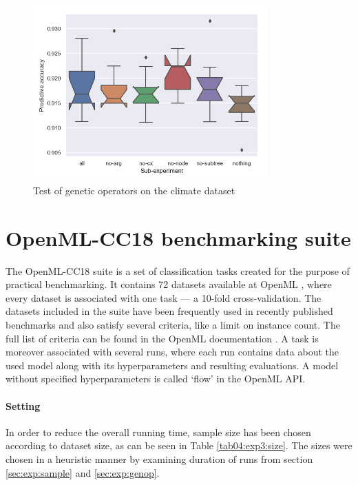 \begin{figure}[pt]\centering
\includegraphics[width=0.8\textwidth]{../img/climate-mut-redo.png}
\caption{Test of genetic operators on the climate dataset}
\label{pic04:mut-climate}
\end{figure}

\section{OpenML-CC18 benchmarking suite} \label{sec:exp:openml}

The OpenML-CC18 suite is a set of classification tasks created for the purpose
of practical benchmarking. It contains 72 datasets available at OpenML
\citep{openmlcc18}, where
every dataset is associated with one task --- a 10-fold cross-validation. The
datasets included in the suite have been frequently used in recently published
benchmarks and also satisfy several criteria, like a limit on instance count.
The full list of criteria can be found in the OpenML documentation
\citep{openmlcc18docs}. A task is moreover associated with several runs, where
each run contains data about the used model along with its hyperparameters and
resulting evaluations. A model without specified hyperparameters is called
`flow' in the OpenML API.

\paragraph{Setting}
In order to reduce the overall running time, sample size has been chosen
according to dataset size, as can be seen in Table \ref{tab04:exp3:size}.
The sizes were chosen in a heuristic manner by examining duration of runs
from section \ref{sec:exp:sample} and \ref{sec:exp:genop}.

